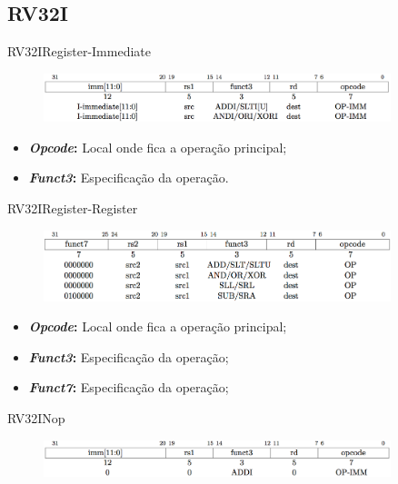 \documentclass[aspectratio=169, xcolor=dvipsnames]{beamer}
\let\olditem=\item%
\renewcommand{\item}{\olditem \justifying}
\begin{document}
\subsection{RV32I}
\begin{frame}{RV32I}{Register-Immediate}
	\begin{figure}
		\centering
		\label{fig:}
		\includegraphics[width=0.9\textwidth]{img/register-immediate.png}
	\end{figure}
	\begin{itemize}
		\item \textbf{\textit{Opcode}:} Local onde fica a operação principal;
		\item \textbf{\textit{Funct3}:} Especificação da operação.
	\end{itemize}
\end{frame}

\begin{frame}{RV32I}{Register-Register}
	\begin{figure}
		\centering
		\label{fig:}
		\includegraphics[width=0.9\textwidth]{img/register-register.png}
	\end{figure}
	\begin{itemize}
		\item \textbf{\textit{Opcode}:} Local onde fica a operação principal;
		\item \textbf{\textit{Funct3}:} Especificação da operação;
		\item \textbf{\textit{Funct7}:} Especificação da operação;
	\end{itemize}
\end{frame}

\begin{frame}{RV32I}{Nop}
	\begin{figure}
		\centering
		\label{fig:}
		\includegraphics[width=0.9\textwidth]{img/nop.png}
	\end{figure}
\end{frame}
\end{document}
